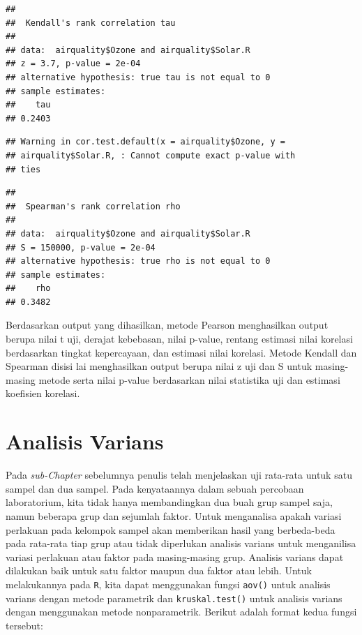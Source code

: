 \documentclass[]{book}
\newenvironment{Shaded}{\begin{snugshade}}{\end{snugshade}}
\newcommand{\CommentTok}[1]{\textcolor[rgb]{0.56,0.35,0.01}{\textit{#1}}}
\newcommand{\DataTypeTok}[1]{\textcolor[rgb]{0.13,0.29,0.53}{#1}}
\newcommand{\KeywordTok}[1]{\textcolor[rgb]{0.13,0.29,0.53}{\textbf{#1}}}
\newcommand{\NormalTok}[1]{#1}
\newcommand{\OperatorTok}[1]{\textcolor[rgb]{0.81,0.36,0.00}{\textbf{#1}}}
\newcommand{\StringTok}[1]{\textcolor[rgb]{0.31,0.60,0.02}{#1}}
\theoremstyle{definition}
\theoremstyle{definition}
\theoremstyle{definition}
\theoremstyle{remark}
\begin{document}
\begin{verbatim}
## 
##  Kendall's rank correlation tau
## 
## data:  airquality$Ozone and airquality$Solar.R
## z = 3.7, p-value = 2e-04
## alternative hypothesis: true tau is not equal to 0
## sample estimates:
##    tau 
## 0.2403
\end{verbatim}

\begin{Shaded}
\end{Shaded}

\begin{verbatim}
## Warning in cor.test.default(x = airquality$Ozone, y =
## airquality$Solar.R, : Cannot compute exact p-value with
## ties
\end{verbatim}

\begin{verbatim}
## 
##  Spearman's rank correlation rho
## 
## data:  airquality$Ozone and airquality$Solar.R
## S = 150000, p-value = 2e-04
## alternative hypothesis: true rho is not equal to 0
## sample estimates:
##    rho 
## 0.3482
\end{verbatim}

Berdasarkan output yang dihasilkan, metode Pearson menghasilkan output berupa nilai t uji, derajat kebebasan, nilai p-value, rentang estimasi nilai korelasi berdasarkan tingkat kepercayaan, dan estimasi nilai korelasi. Metode Kendall dan Spearman disisi lai menghasilkan output berupa nilai z uji dan S untuk masing-masing metode serta nilai p-value berdasarkan nilai statistika uji dan estimasi koefisien korelasi.

\hypertarget{analisis-varians}{%
\section{Analisis Varians}\label{analisis-varians}}

Pada \emph{sub-Chapter} sebelumnya penulis telah menjelaskan uji rata-rata untuk satu sampel dan dua sampel. Pada kenyataannya dalam sebuah percobaan laboratorium, kita tidak hanya membandingkan dua buah grup sampel saja, namun beberapa grup dan sejumlah faktor. Untuk menganalisa apakah variasi perlakuan pada kelompok sampel akan memberikan hasil yang berbeda-beda pada rata-rata tiap grup atau tidak diperlukan analisis varians untuk menganilisa variasi perlakuan atau faktor pada masing-masing grup. Analisis varians dapat dilakukan baik untuk satu faktor maupun dua faktor atau lebih. Untuk melakukannya pada \texttt{R}, kita dapat menggunakan fungsi \texttt{aov()} untuk analisis varians dengan metode parametrik dan \texttt{kruskal.test()} untuk analisis varians dengan menggunakan metode nonparametrik. Berikut adalah format kedua fungsi tersebut:
\end{document}

